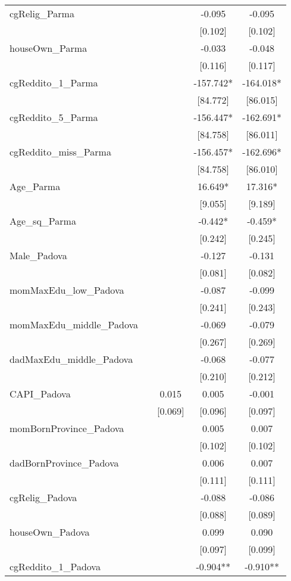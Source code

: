 \documentclass[]{article}
\begin{document}
\begin{tabular}{lcccc}
cgRelig\_Parma &  &  & -0.095 & -0.095 \\
 &  &  & [0.102] & [0.102] \\
houseOwn\_Parma &  &  & -0.033 & -0.048 \\
 &  &  & [0.116] & [0.117] \\
cgReddito\_1\_Parma &  &  & -157.742* & -164.018* \\
 &  &  & [84.772] & [86.015] \\
cgReddito\_5\_Parma &  &  & -156.447* & -162.691* \\
 &  &  & [84.758] & [86.011] \\
cgReddito\_miss\_Parma &  &  & -156.457* & -162.696* \\
 &  &  & [84.758] & [86.010] \\
Age\_Parma &  &  & 16.649* & 17.316* \\
 &  &  & [9.055] & [9.189] \\
Age\_sq\_Parma &  &  & -0.442* & -0.459* \\
 &  &  & [0.242] & [0.245] \\
Male\_Padova &  &  & -0.127 & -0.131 \\
 &  &  & [0.081] & [0.082] \\
momMaxEdu\_low\_Padova &  &  & -0.087 & -0.099 \\
 &  &  & [0.241] & [0.243] \\
momMaxEdu\_middle\_Padova &  &  & -0.069 & -0.079 \\
 &  &  & [0.267] & [0.269] \\
dadMaxEdu\_middle\_Padova &  &  & -0.068 & -0.077 \\
 &  &  & [0.210] & [0.212] \\
CAPI\_Padova &  & 0.015 & 0.005 & -0.001 \\
 &  & [0.069] & [0.096] & [0.097] \\
momBornProvince\_Padova &  &  & 0.005 & 0.007 \\
 &  &  & [0.102] & [0.102] \\
dadBornProvince\_Padova &  &  & 0.006 & 0.007 \\
 &  &  & [0.111] & [0.111] \\
cgRelig\_Padova &  &  & -0.088 & -0.086 \\
 &  &  & [0.088] & [0.089] \\
houseOwn\_Padova &  &  & 0.099 & 0.090 \\
 &  &  & [0.097] & [0.099] \\
cgReddito\_1\_Padova &  &  & -0.904** & -0.910** \\

\end{tabular}
\end{document}
